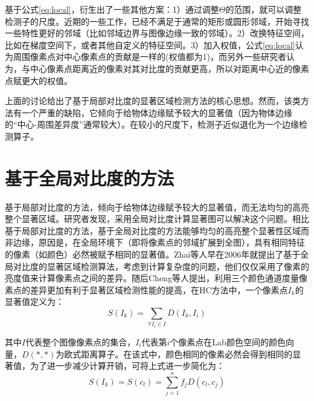基于公式\ref{eq:local}，衍生出了一些其他方案：1）通过调整$\Theta$的范围，就可以调整检测子的尺度。近期的一些工作，已经不满足于通常的矩形或圆形邻域，开始寻找一些特性更好的邻域（比如邻域边界与图像边缘一致的邻域）。2）改换特征空间，比如在梯度空间下，或者其他自定义的特征空间。3）加入权值，公式\ref{eq:local}认为周围像素点对中心像素点的贡献是一样的(权值都为1)，而另外一些研究者认为，与中心像素点距离近的像素对其对比度的贡献更高，所以对距离中心近的像素点赋更大的权值。

上面的讨论给出了基于局部对比度的显著区域检测方法的核心思想。然而，该类方法有一个严重的缺陷，它倾向于给物体边缘赋予较大的显著值（因为物体边缘的“中心-周围差异度”通常较大）。在较小的尺度下，检测子近似退化为一个边缘检测算子。

\section{基于全局对比度的方法}
基于局部对比度的方法，倾向于给物体边缘赋予较大的显著值，而无法均匀的高亮整个显著区域。研究者发现，采用全局对比度计算显著图可以解决这个问题。相比基于局部对比度的方法，基于全局对比度的方法能够均匀的高亮整个显著性区域而非边缘，原因是，在全局环境下（即将像素点的邻域扩展到全图），具有相同特征的像素（如颜色）必然被赋予相同的显著值。Zhai\cite{zhai2006visual}等人早在2006年就提出了基于全局对比度的显著区域检测算法，考虑到计算复杂度的问题，他们仅仅采用了像素的亮度值来计算像素点之间的差异。随后Cheng\cite{cheng2011global}等人提出，利用三个颜色通道度量像素点的差异更加有利于显著区域检测性能的提高，在HC方法中，一个像素点$I_k$的显著值定义为：
\begin{equation}
S(I_k)=\sum_{\forall I_i \in I}D(I_k,I_i)
\end{equation}

其中$I$代表整个图像像素点的集合，$I_i$代表第$i$个像素点在Lab颜色空间的颜色向量，$D(*,*)$为欧式距离算子。在该式中，颜色相同的像素必然会得到相同的显著值，为了进一步减少计算开销，可将上式进一步简化为：
\begin{equation}
S(I_k)=S(c_l)=\sum_{j=1}^n f_j D(c_l,c_j)
\end{equation}

